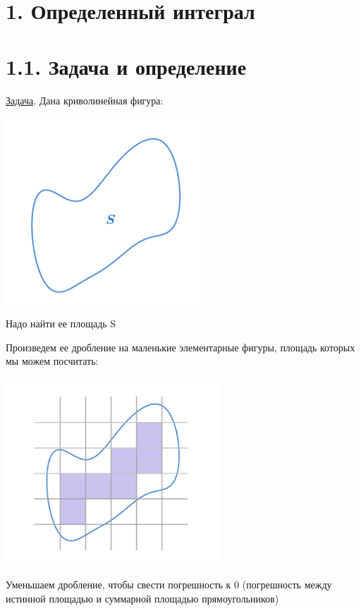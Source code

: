 \documentclass[12pt]{article}
\begin{document}
    \section{1. Определенный интеграл}


    \section{1.1. Задача и определение}

    \underline{Задача}. Дана криволинейная фигура:


    \begin{center}
        \includegraphics[height=7cm]{images/calculus_2024_02_07_0}
    \end{center}

    Надо найти ее площадь S

    Произведем ее дробление на маленькие элементарные фигуры, площадь которых мы можем посчитать:

    \begin{center}
        \includegraphics[height=7cm]{images/calculus_2024_02_07_1}
    \end{center}

    Уменьшаем дробление, чтобы свести погрешность к 0 (погрешность между истинной площадью и суммарной площадью прямоугольников)
\end{document}
